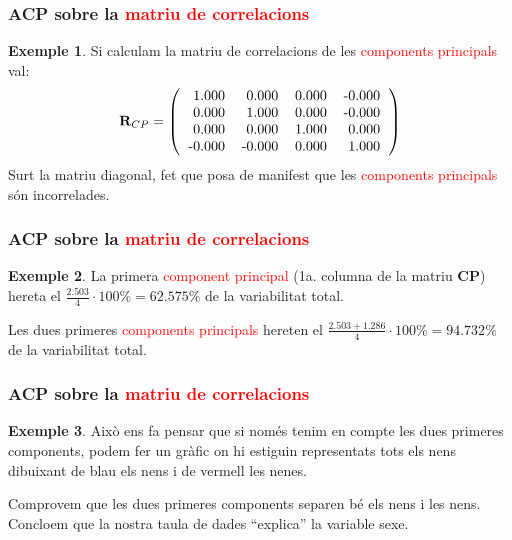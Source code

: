 \documentclass[12pt,t]{beamer}
\newcommand{\red}[1]{\textcolor{red}{#1}}
\theoremstyle{plain}
\theoremstyle{definition}
\newtheorem{exemple}{Exemple}
\begin{document}
\begin{frame}
\frametitle{ACP sobre la \red{matriu de correlacions}}
\begin{exemple}
Si calculam la matriu de correlacions de les \red{components principals} val:
\[
\mathbf{R}_{CP}=\left(
\begin{tabular}{rrrr}
  1.000 & 0.000 & 0.000 & -0.000 \\ 
  0.000 & 1.000 & 0.000 & -0.000 \\ 
  0.000 & 0.000 & 1.000 & 0.000 \\ 
  -0.000 & -0.000 & 0.000 & 1.000 \\ 
  \end{tabular}\right)
\]
Surt la matriu diagonal, fet que posa de manifest que les \red{components principals} són incorrelades.
\end{exemple}
\end{frame}



\begin{frame}
\frametitle{ACP sobre la \red{matriu de correlacions}}
\begin{exemple}

La primera \red{component principal} (1a. columna de la matriu $\mathbf{CP}$) hereta el 
$\frac{2.503}{4}\cdot 100\% = 
62.575\%$ de la variabilitat total.

Les dues primeres \red{components principals} hereten el 
$\frac{2.503 + 1.286}{4}\cdot 100\% = 
94.732\%$ de la variabilitat total.
\end{exemple}
\end{frame}

\begin{frame}
\frametitle{ACP sobre la \red{matriu de correlacions}}
\begin{exemple}
Això ens fa pensar que si només tenim en compte les dues primeres components, podem fer un gràfic on hi estiguin 
representats tots els nens dibuixant de blau els nens i de vermell les nenes.
\medskip

Comprovem que les dues primeres components separen bé els nens i les nens. Concloem que la nostra taula de dades 
``explica'' la variable sexe.
\end{exemple}
\end{frame}
\end{document}
